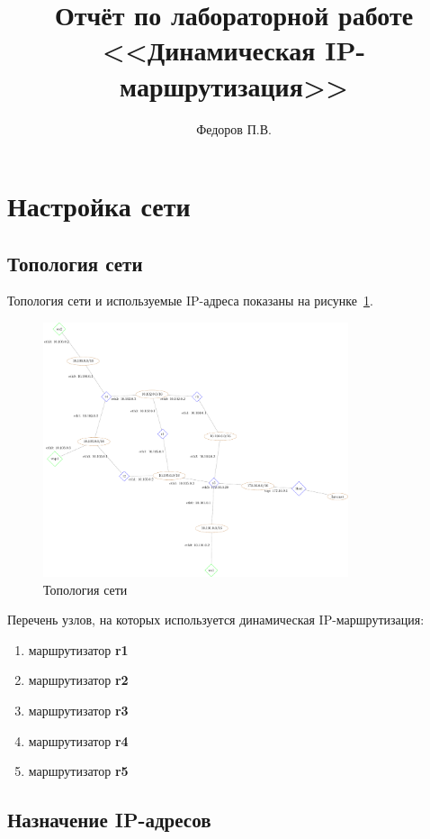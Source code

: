 \documentclass[a4paper,12pt]{article}
\title{Отчёт по лабораторной работе \\ <<Динамическая IP-маршрутизация>>}
\author{Федоров П.В.}
\begin{document}
\maketitle

\tableofcontents

\section{Настройка сети}

\subsection{Топология сети}

Топология сети и используемые IP-адреса показаны на рисунке~\ref{fig:network}.

\begin{figure}
\centering
\includegraphics[width=0.8\textwidth]{includes/network_gv.pdf}
\caption{Топология сети}
\label{fig:network}
\end{figure}

Перечень узлов, на которых используется динамическая IP-маршрутизация:
\begin{enumerate}
    \item маршрутизатор \textbf{r1}
    \item маршрутизатор \textbf{r2}
    \item маршрутизатор \textbf{r3}
    \item маршрутизатор \textbf{r4}
    \item маршрутизатор \textbf{r5}
\end{enumerate}

\subsection{Назначение IP-адресов}
\end{document}
